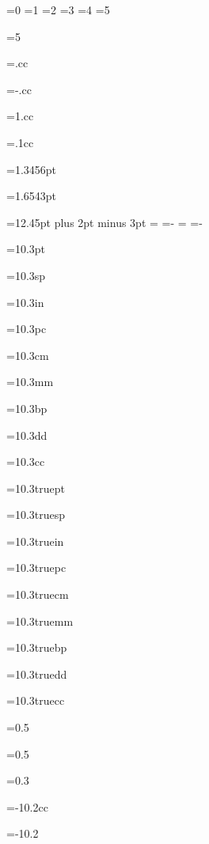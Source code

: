 
=0
=1
=2
=3
=4
=5

=5
\showthe{}

=.cc
\showthe{}

=-.cc
\showthe{}

=1.cc
\showthe{}

=.1cc
\showthe{}

=1.3456pt
\showthe{}

=1.6543pt
\showthe{}

=12.45pt plus 2pt minus 3pt
\showthe{}
=
\showthe{}
=-
\showthe{}
=
\showthe{}
=-
\showthe{}

=10.3pt
\showthe{}

=10.3sp
\showthe{}

=10.3in
\showthe{}

=10.3pc
\showthe{}

=10.3cm
\showthe{}

=10.3mm
\showthe{}

=10.3bp
\showthe{}

=10.3dd
\showthe{}

=10.3cc
\showthe{}


=10.3truept
\showthe{}

=10.3truesp
\showthe{}

=10.3truein
\showthe{}

=10.3truepc
\showthe{}

=10.3truecm
\showthe{}

=10.3truemm
\showthe{}

=10.3truebp
\showthe{}

=10.3truedd
\showthe{}

=10.3truecc
\showthe{}

=0.5
\showthe{}

=0.5
\showthe{}

=0.3
\showthe{}

=-10.2cc
\showthe{}

=-10.2
\showthe{}

